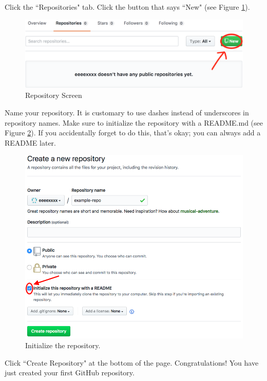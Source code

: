\documentclass[11pt,a4paper]{article}
\begin{document}
Click the ``Repositories" tab.
Click the button that says ``New" (see Figure \ref{fig:repo}).

\begin{figure}[h]
\centering
\includegraphics[width=.7\textwidth]{figures/repository_page.png}
\caption{Repository Screen}
\label{fig:repo}
\end{figure}

Name your repository.
It is customary to use dashes instead of underscores in repository names.
Make sure to initialize the repository with a README.md (see Figure \ref{fig:init-repo}).
If you accidentally forget to do this, that's okay; you can always add a README later.

\begin{figure}[h]
\centering
\includegraphics[width=.7\textwidth]{figures/init_repo}
\caption{Initialize the repository.}
\label{fig:init-repo}
\end{figure}

Click ``Create Repository" at the bottom of the page.
Congratulations!
You have just created your first GitHub repository.
\end{document}
